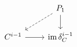 \documentclass[12pt]{standalone}
\begin{document}
        $$

\begin{tikzcd}
    & P_1 \ar[dl,dashed] \ar[d]\\
    C^{i-1} \ar[r] & \operatorname{im} \delta_C^{i-1} 
\end{tikzcd}
        $$
        
\end{document}
